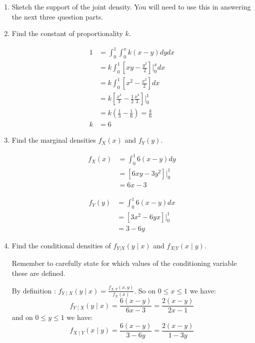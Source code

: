 \documentclass{article}
\newcommand{\1}{\mathbf{1}}
\begin{document}
\begin{enumerate}
    \item Sketch the support of the joint density. You will need to use this in answering the next three question parts.

    \item Find the constant of proportionality $k$.
    
    \begin{align*}
    1 &= \int_0^1\int_0^x k(x-y)dydx\\
      &= k \int_0^1 \left[xy - \frac{y^2}{2}\right]\bigg |_0^x dx \\
      &= k \int_0^1 \left[x^2 - \frac{x^2}{2}\right] dx \\
      &= k \left[ \frac{x^3}{3} - \frac{1}{2}\frac{x^3}{3} \right] \bigg |_0^1 \\
      &= k \left( \frac{1}{3} - \frac{1}{6}\right) = \frac{k}{6}\\
    k &= 6
    \end{align*}

    \item Find the marginal densities $f_X(x)$ and $f_Y(y)$.
    
    \begin{align*}
    f_X(x) &= \int_0^1 6(x-y) dy \\
    &= \left[6xy - 3y^2\right]\bigg|_0^1 \\
    &= 6x-3
    \end{align*}
    
    \begin{align*}
    f_Y(y) &= \int_0^1 6(x-y) dx \\
    &= \left[3x^2 - 6yx\right]\bigg|_0^1 \\
    &= 3 - 6y
    \end{align*}

    \newpage
    \item Find the conditional densities of $f_{Y|X}(y\mid x)$ and $f_{X|Y}(x\mid y)$.\par
    Remember to carefully state for which values of the conditioning variable these are defined.
    
    By definition : $f_{Y\mid X}(y \mid x) = \frac{f_{X, Y}(x, y)}{f_X(x)}$. So on $0\leq x \leq 1$ we have:
    $$ f_{Y\mid X}(y \mid x) = \frac{6(x-y)}{6x-3} = \frac{2(x-y)}{2x-1} $$
    and on $0\leq y\leq 1 $ we have:
    $$ f_{X\mid Y}(x \mid y) = \frac{6(x-y)}{3-6y} = \frac{2(x-y)}{1-3y} $$
   
\end{enumerate}
\end{document}
